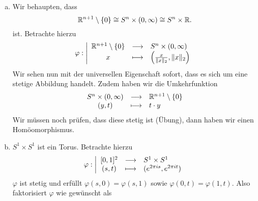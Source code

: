 \begin{example}
    \begin{enumerate}[a)]
        \item Wir behaupten, dass
            \[
                \mathbb{R}^{n+1} \setminus \left \{0\right\} \cong S^n \times (0,\infty) \cong S^n \times \mathbb{R}
            .\] 
            ist. Betrachte hierzu
                \begin{equation*}
                \varphi : \left| \begin{array}{c c l} 
                    \mathbb{R}^{n+1}\setminus \left \{0\right\}  & \longrightarrow & S^n\times (0,\infty) \\
                    x & \longmapsto &  \left( \frac{x}{\lVert x \rVert _2}, \lVert x \rVert _2 \right) 
                \end{array} \right.
            \end{equation*}
            Wir sehen nun mit der universellen Eigenschaft sofort, dass es sich um eine stetige Abbildung handelt. Zudem haben wir die Umkehrfunktion
                \begin{equation*}
                \begin{array}{c c l} 
                    S^n \times (0,\infty) & \longrightarrow & \mathbb{R}^{n+1}\setminus \left \{0\right\}  \\
                    (y,t) & \longmapsto &  t\cdot y
                \end{array}
            \end{equation*}
            Wir müssen noch prüfen, dass diese stetig ist (Übung), dann haben wir einen Homöomorphismus.
        \item $S^1\times S^1$ ist ein Torus. Betrachte hierzu
               \begin{equation*}
               \varphi : \left| \begin{array}{c c l} 
                   [0,1]^2 & \longrightarrow & S^1 \times S^1 \\
                   (s,t) & \longmapsto &  (e^{2\pi is}, e^{2\pi it})
               \end{array} \right.
           \end{equation*}
           $\varphi $ ist stetig und erfüllt $\varphi (s,0) = \varphi (s,1)$ sowie $\varphi (0,t) = \varphi (1,t)$. Also faktorisiert $\varphi $ wie gewünscht als
\end{enumerate}
\end{example}
